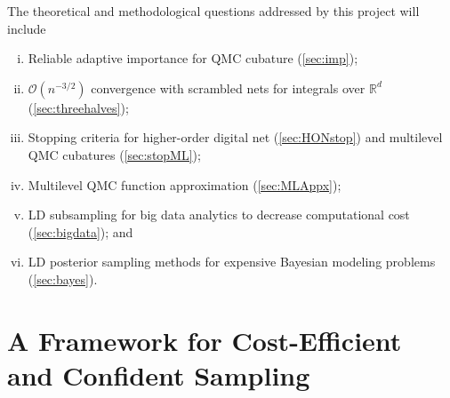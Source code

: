 \documentclass[11pt]{NSFamsart}
\newcommand{\cmtS}[1]{{\color{blue}{(Simon: #1)}}}
\newcommand{\SEC}{Sect.\xspace}
\newcommand{\reals}{{\mathbb{R}}}
\newcommand{\Order}{\mathcal{O}}
\begin{document}
The theoretical and methodological questions addressed by this project will include \cmtS{to modify, move later into \SEC 1? and have this has a one-paragraph abstract on the overarching framework \& broader impacts?}
\begin{enumerate}[i)]
\item Reliable adaptive importance for QMC cubature (\cref{sec:imp});
\item $\Order(n^{-3/2})$ convergence with scrambled nets for integrals over $\reals^d$ (\cref{sec:threehalves});
\item Stopping criteria for higher-order digital net (\cref{sec:HONstop}) and multilevel QMC cubatures (\cref{sec:stopML});
\item Multilevel QMC function approximation (\cref{sec:MLAppx});
\item LD subsampling for big data analytics to decrease computational cost (\cref{sec:bigdata}); and
\item LD posterior sampling methods for expensive Bayesian modeling problems (\cref{sec:bayes}).
\end{enumerate}







\section{A Framework for Cost-Efficient and Confident Sampling}

\cmtS{Need to revise \& restructure given motivating scientific \& big data aims. But topics largely OK (with a bit of expansion)?
\begin{itemize}
\item Cost-efficient Bayesian inference
\item MLQMC / Multi-level experimental design
\item Cost-efficient big data analytics
\item Cost-efficient QMC? Fred: does this capture some of the proposed topics you had here, or do we need new ideas?

\item 1) Motivation, 2) Tasks, 3) Implementation and Application
\end{itemize}
}



\end{document}
